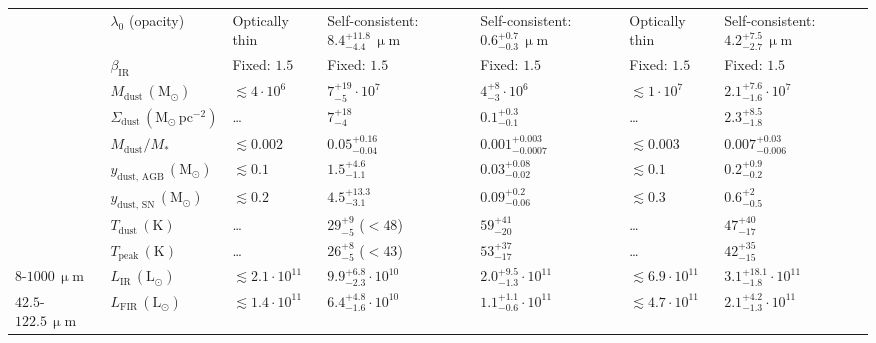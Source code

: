 \begin{table}
\begin{tabular}{llp{2.05cm}p{2.05cm}p{2.05cm}p{2.05cm}p{2.05cm}}
        \\
        & $\lambda_0$ (opacity) & Optically thin & Self-consistent: $8.4_{ -4.4 }^{ +11.8 } \, \mathrm{ \upmu m }$ & Self-consistent: $0.6_{ -0.3 }^{ +0.7 } \, \mathrm{ \upmu m }$ & Optically thin & Self-consistent: $4.2_{ -2.7 }^{ +7.5 } \, \mathrm{ \upmu m }$
        \\
        & $\beta_\text{IR}$ & Fixed: $1.5$ & Fixed: $1.5$ & Fixed: $1.5$ & Fixed: $1.5$ & Fixed: $1.5$
        \\
        \cline{2-7}
        \vspace{1ex}
        & $M_\text{dust} \, (\mathrm{M_\odot})$ & $\lesssim4 \cdot 10^{6}$ & $7_{-5}^{+19} \cdot 10^{7}$ & $4_{-3}^{+8} \cdot 10^{6}$ & $\lesssim1 \cdot 10^{7}$ & $2.1_{-1.6}^{+7.6} \cdot 10^{7}$
        \\
        & $\Sigma_\text{dust} \, (\mathrm{M_\odot \, pc^{-2}})$ & \dots & $7_{-4}^{+18}$ & $0.1_{-0.1}^{+0.3}$ & \dots & $2.3_{-1.8}^{+8.5}$
        \\
        & $M_\text{dust} / M_*$ & $\lesssim0.002$ & $0.05_{-0.04}^{+0.16}$ & $0.001_{-0.0007}^{+0.003}$ & $\lesssim0.003$ & $0.007_{-0.006}^{+0.03}$
        \\
        & $y_\text{dust, AGB} \, (\mathrm{M_\odot})$ & $\lesssim0.1$ & $1.5_{-1.1}^{+4.6}$ & $0.03_{-0.02}^{+0.08}$ & $\lesssim0.1$ & $0.2_{-0.2}^{+0.9}$
        \\
        \vspace{1.5ex}
        & $y_\text{dust, SN} \, (\mathrm{M_\odot})$ & $\lesssim0.2$ & $4.5_{-3.1}^{+13.3}$ & $0.09_{-0.06}^{+0.2}$ & $\lesssim0.3$ & $0.6_{-0.5}^{+2}$
        \\
        & $T_\text{dust} \, (\mathrm{K})$ & \dots & $29_{-5}^{+9}$ ($<48$) & $59_{-20}^{+41}$ & \dots & $47_{-17}^{+40}$
        \\
        \vspace{1.5ex}
        & $T_\text{peak} \, (\mathrm{K})$ & \dots & $26_{-5}^{+8}$ ($<43$) & $53_{-17}^{+37}$ & \dots & $42_{-15}^{+35}$
        \\
        $8$-$1000 \, \mathrm{\upmu m}$ & $L_\mathrm{IR} \, (\mathrm{L_\odot})$ & $\lesssim2.1 \cdot 10^{11}$ & $9.9_{-2.3}^{+6.8} \cdot 10^{10}$ & $2.0_{-1.3}^{+9.5} \cdot 10^{11}$ & $\lesssim6.9 \cdot 10^{11}$ & $3.1_{-1.8}^{+18.1} \cdot 10^{11}$
        \\
        \vspace{1.5ex}
        $42.5$-$122.5 \, \mathrm{\upmu m}$ & $L_\mathrm{FIR} \, (\mathrm{L_\odot})$ & $\lesssim1.4 \cdot 10^{11}$ & $6.4_{-1.6}^{+4.8} \cdot 10^{10}$ & $1.1_{-0.6}^{+1.1} \cdot 10^{11}$ & $\lesssim4.7 \cdot 10^{11}$ & $2.1_{-1.3}^{+4.2} \cdot 10^{11}$

\end{tabular}
\end{table}
